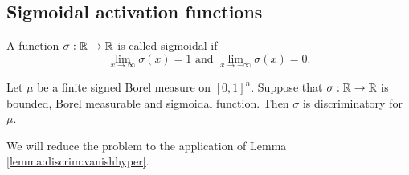 \subsection{Sigmoidal activation functions}
\label{subsection:universality:cybenko:2}
\begin{definition}
A function $\sigma : {\mathbb R} \to {\mathbb R}$ is called sigmoidal if \[
    \lim_{x \to \infty} \sigma(x) = 1 \text{ and } \lim_{x \to -\infty} \sigma(x) = 0.
\]
\end{definition}

\begin{proposition}
\label{prop:discrim:boundedmeasdiscrim}
Let $\mu$ be a finite signed Borel measure on $[0,1]^n$. Suppose that $\sigma : {\mathbb R} \to {\mathbb R}$ is bounded, Borel measurable and sigmoidal function. Then $\sigma$ is discriminatory for $\mu$. 
\end{proposition}
\begin{proof-idea*}
We will reduce the problem to the application of Lemma \ref{lemma:discrim:vanishhyper}.
\end{proof-idea*}
